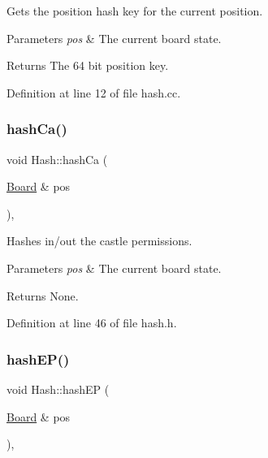Gets the position hash key for the current position. 


\begin{DoxyParams}{Parameters}
{\em pos} & The current board state. \\
\hline
\end{DoxyParams}
\begin{DoxyReturn}{Returns}
The 64 bit position key. 
\end{DoxyReturn}


Definition at line 12 of file hash.\+cc.

\mbox{\label{namespaceHash_a27755caeb25c1de2a9cd390440b73f37}} 
\subsubsection{\texorpdfstring{hash\+Ca()}{hashCa()}}
{\footnotesize\ttfamily void Hash\+::hash\+Ca (\begin{DoxyParamCaption}\item[{\mbox{\hyperlink{classBoard}{Board}} \&}]{pos }\end{DoxyParamCaption})\hspace{0.3cm}{\ttfamily [inline]}, {\ttfamily [noexcept]}}



Hashes in/out the castle permissions. 


\begin{DoxyParams}{Parameters}
{\em pos} & The current board state. \\
\hline
\end{DoxyParams}
\begin{DoxyReturn}{Returns}
None. 
\end{DoxyReturn}


Definition at line 46 of file hash.\+h.

\mbox{\label{namespaceHash_a8f7a084e23934f0acade5177e1925928}} 
\subsubsection{\texorpdfstring{hash\+E\+P()}{hashEP()}}
{\footnotesize\ttfamily void Hash\+::hash\+EP (\begin{DoxyParamCaption}\item[{\mbox{\hyperlink{classBoard}{Board}} \&}]{pos }\end{DoxyParamCaption})\hspace{0.3cm}{\ttfamily [inline]}, {\ttfamily [noexcept]}}



